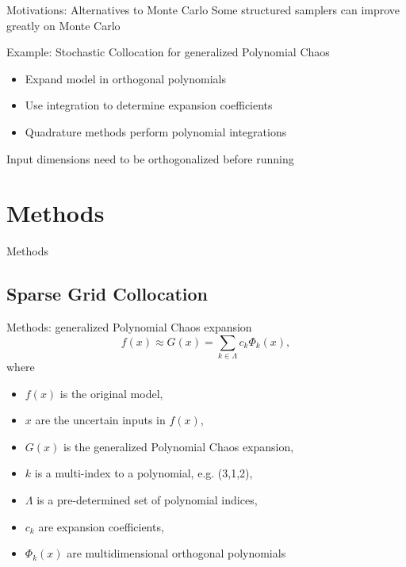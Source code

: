 \documentclass[t,9pt,svgnames]{beamer}
\begin{document}
\begin{frame}{Motivations: Alternatives to Monte Carlo}
  \vfill
  Some structured samplers can improve greatly on Monte Carlo
  \vfill

  Example: Stochastic Collocation for generalized Polynomial Chaos
  \vfill
  \begin{itemize}
    \item Expand model in orthogonal polynomials
  \vfill
    \item Use integration to determine expansion coefficients
  \vfill
    \item Quadrature methods perform polynomial integrations
  \end{itemize}
  \vfill
  Input dimensions need to be orthogonalized before running
  \vfill
\end{frame}
%
%
\section{Methods}
\begin{frame}{Methods}
\end{frame}

\subsection{Sparse Grid Collocation}
\begin{frame}{Methods: generalized Polynomial Chaos expansion}
  \vfill
  \begin{equation}
    f(x) \approx G(x) = \sum_{k\in\Lambda} c_k \Phi_k(x), 
  \end{equation}
  where
  \begin{itemize}
  \vfill
    \item $f(x)$ is the original model,
  \vfill
    \item $x$ are the uncertain inputs in $f(x)$,
  \vfill
    \item $G(x)$ is the generalized Polynomial Chaos expansion,
  \vfill
    \item $k$ is a multi-index to a polynomial, e.g. (3,1,2),
  \vfill
    \item $\Lambda$ is a pre-determined set of polynomial indices,
  \vfill
    \item $c_k$ are expansion coefficients,
  \vfill
    \item $\Phi_k(x)$ are multidimensional orthogonal polynomials
  \end{itemize}
  \vfill
\end{frame}
\end{document}
